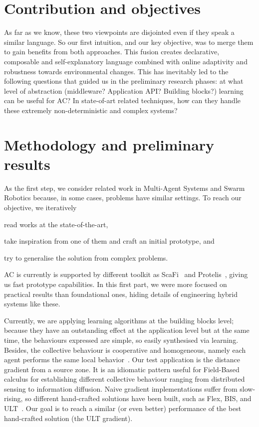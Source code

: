 \documentclass[conference]{IEEEtran}
\begin{document}
\section{Contribution and objectives}
As far as we know, these two viewpoints are disjointed even if they speak a similar language. So our first intuition, and our key objective,
was to merge them to gain benefits from both approaches. This fusion creates declarative,
composable and self-explanatory language combined with online adaptivity and robustness towards environmental changes.
%
This has inevitably led to the following questions that guided us in the preliminary research phases: at what level of abstraction (middleware? Application API? Building blocks?) learning can be useful for AC? 
In state-of-art related techniques, how can they handle these extremely non-deterministic and complex systems?  
%
\section{Methodology and preliminary results}
%
As the first step, we consider related work in Multi-Agent Systems and Swarm Robotics because, in some cases, problems have similar settings.
To reach our objective, we iteratively 
\begin{enumerate*}[label=(\roman*)]
\item read works at the state-of-the-art,
\item take inspiration from one of them and craft an initial prototype, and
\item try to generalise the solution from complex problems.
\end{enumerate*}
AC is currently is supported by different toolkit as ScaFi~\cite{DBLP:conf/ecoop/CasadeiV16} and Protelis~\cite{DBLP:conf/sac/PianiniVB15}, giving us fast prototype capabilities.
In this first part, we were more focused on practical results than foundational ones, hiding details of engineering hybrid systems like these.  

Currently, we are applying learning algorithms at the building blocks level; because they have an outstanding effect at the application level but
at the same time, the behaviours expressed are simple, so easily synthesised via learning.
Besides, the collective behaviour is cooperative and homogeneous, namely each agent performs the same local behavior~\cite{DBLP:journals/aamas/PanaitL05}.  %
%
Our test application is the distance gradient from a source zone. 
It is an idiomatic pattern useful for Field-Based calculus for establishing different collective behaviour ranging from distributed sensing to information diffusion.
%
Naive gradient implementations suffer from slow-rising, so different hand-crafted solutions have been built, such as Flex, BIS, and ULT~\cite{DBLP:conf/saso/AudritoCDV17}.
Our goal is to reach a similar (or even better) performance of the best hand-crafted solution (the ULT gradient).
\end{document}
